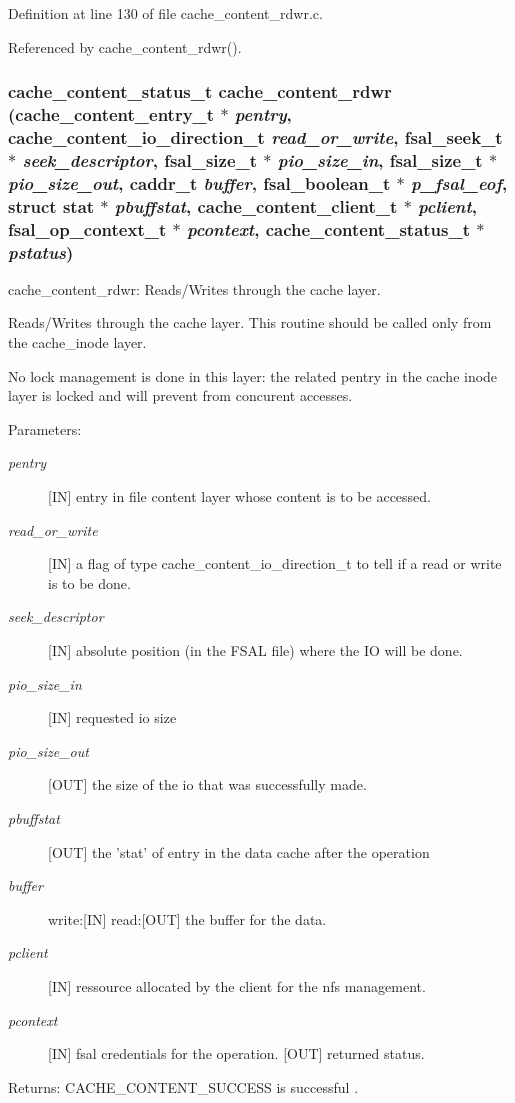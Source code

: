 Definition at line 130 of file cache\_\-content\_\-rdwr.c.

Referenced by cache\_\-content\_\-rdwr().
\subsubsection{\setlength{\rightskip}{0pt plus 5cm}cache\_\-content\_\-status\_\-t cache\_\-content\_\-rdwr (cache\_\-content\_\-entry\_\-t $\ast$ {\em pentry}, cache\_\-content\_\-io\_\-direction\_\-t {\em read\_\-or\_\-write}, fsal\_\-seek\_\-t $\ast$ {\em seek\_\-descriptor}, fsal\_\-size\_\-t $\ast$ {\em pio\_\-size\_\-in}, fsal\_\-size\_\-t $\ast$ {\em pio\_\-size\_\-out}, caddr\_\-t {\em buffer}, fsal\_\-boolean\_\-t $\ast$ {\em p\_\-fsal\_\-eof}, struct stat $\ast$ {\em pbuffstat}, cache\_\-content\_\-client\_\-t $\ast$ {\em pclient}, fsal\_\-op\_\-context\_\-t $\ast$ {\em pcontext}, cache\_\-content\_\-status\_\-t $\ast$ {\em pstatus})}\label{cache__content__rdwr_8c_a4}


cache\_\-content\_\-rdwr: Reads/Writes through the cache layer.

Reads/Writes through the cache layer. This routine should be called only from the cache\_\-inode layer.

No lock management is done in this layer: the related pentry in the cache inode layer is locked and will prevent from concurent accesses.

\begin{Desc}
\item[Parameters:]
\begin{description}
\item[{\em pentry}][IN] entry in file content layer whose content is to be accessed. \item[{\em read\_\-or\_\-write}][IN] a flag of type cache\_\-content\_\-io\_\-direction\_\-t to tell if a read or write is to be done. \item[{\em seek\_\-descriptor}][IN] absolute position (in the FSAL file) where the IO will be done. \item[{\em pio\_\-size\_\-in}][IN] requested io size \item[{\em pio\_\-size\_\-out}][OUT] the size of the io that was successfully made. \item[{\em pbuffstat}][OUT] the 'stat' of entry in the data cache after the operation \item[{\em buffer}]write:[IN] read:[OUT] the buffer for the data. \item[{\em pclient}][IN] ressource allocated by the client for the nfs management. \item[{\em pcontext}][IN] fsal credentials for the operation.  [OUT] returned status.\end{description}
\end{Desc}
\begin{Desc}
\item[Returns:]CACHE\_\-CONTENT\_\-SUCCESS is successful . \end{Desc}



